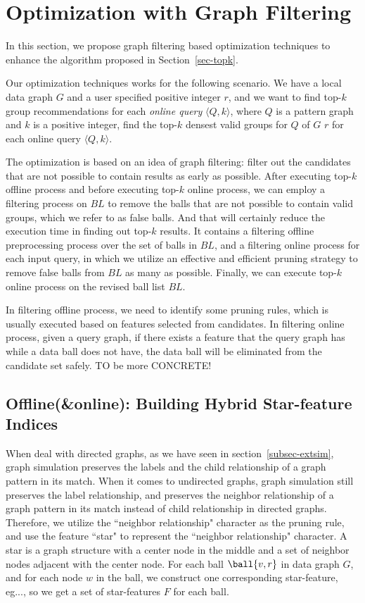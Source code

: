 \section{Optimization with Graph Filtering}
\label{sec-opt}

In this section, we propose graph filtering based optimization techniques to
enhance the algorithm proposed in Section~\ref{sec-topk}.

Our optimization techniques works for the following scenario.
We have a local data graph $G$ and a user specified positive integer $r$, and
we want to find top-$k$ group recommendations for each {\em online query}
$\langle Q, k\rangle$, where $Q$ is a pattern graph and $k$ is a positive
integer, \ie find the top-$k$ densest valid groups for $Q$ of $G$ \wrt $r$ for
each online query $\langle Q,k\rangle$.

The optimization is based on an idea of graph filtering: filter out the candidates that are not possible to contain results as early as possible. After executing top-$k$ offline process and before executing top-$k$ online process, we can employ a filtering process on $BL$ to remove the balls that are not possible to contain valid groups, which we refer to as false balls. And that will certainly reduce the execution time in finding out top-$k$ results. It contains a filtering offline preprocessing process over the set of balls in $BL$, and a filtering online process for each input query, in which we utilize an effective and efficient pruning strategy to remove false balls from $BL$ as many as possible. Finally, we can execute top-$k$ online process on the revised ball list $BL$.

In filtering offline process, we need to identify some pruning rules, which is usually executed based on features selected from candidates. In filtering online process, given a query graph, if there exists a feature that the query graph has while a data ball does not have, the data ball will be eliminated from the candidate set safely. \textcolor[rgb]{0.00,0.00,1.00}{TO be more CONCRETE!}


\subsection{Offline(\&online): Building Hybrid Star-feature Indices}


When deal with directed graphs, as we have seen in section~\ref{subsec-extsim}, graph simulation preserves the labels and the child relationship of a graph pattern in its match. When it comes to undirected graphs, graph simulation still preserves the label relationship, and preserves the neighbor relationship of a graph pattern in its match instead of child relationship in directed graphs. Therefore, we utilize the ``neighbor relationship" character as the pruning rule, and use the feature ``star" to represent the ``neighbor relationship" character. A star is a graph structure with a center node in the middle and a set of neighbor nodes adjacent with the center node. For each ball $\ball{v, r}$ in data graph $G$, and for each node $w$ in the ball, we construct one corresponding star-feature, eg..., so we get a set of star-features $F$ for each ball.

